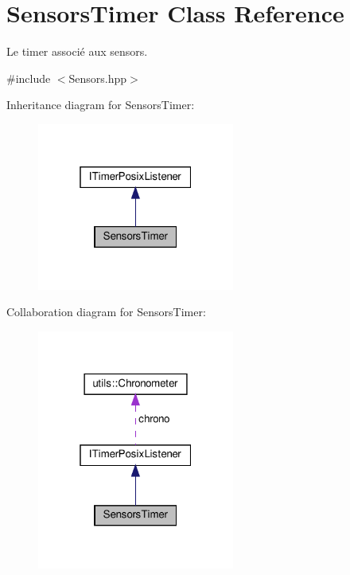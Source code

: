 \hypertarget{classSensorsTimer}{}\section{Sensors\+Timer Class Reference}
\label{classSensorsTimer}


Le timer associé aux sensors.  




{\ttfamily \#include $<$Sensors.\+hpp$>$}



Inheritance diagram for Sensors\+Timer\+:
\nopagebreak
\begin{figure}[H]
\begin{center}
\leavevmode
\includegraphics[width=184pt]{classSensorsTimer__inherit__graph}
\end{center}
\end{figure}


Collaboration diagram for Sensors\+Timer\+:
\nopagebreak
\begin{figure}[H]
\begin{center}
\leavevmode
\includegraphics[width=184pt]{classSensorsTimer__coll__graph}
\end{center}
\end{figure}
